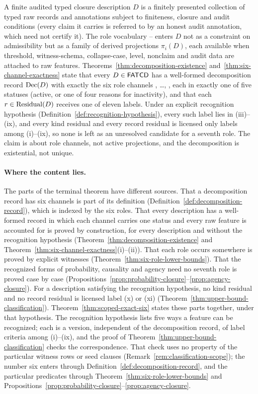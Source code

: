 A finite audited typed closure description \(D\) is a finitely
presented collection of typed raw records and annotations subject to
finiteness, closure and audit conditions (every claim it carries is referred
to by an honest audit annotation, which need not certify it). The role
vocabulary \Pone{}--\Psix{} enters \(D\) not as a constraint on
admissibility but as a family of derived projections \(\pi_i(D)\),
each available when threshold, witness-schema, collapse-case, level,
nonclaim and audit data are
attached to raw features. Theorems~\ref{thm:decomposition-existence} and~\ref{thm:six-channel-exactness} state that
every \(D \in \mathsf{FATCD}{}\) has a well-formed decomposition record
\(\operatorname{Dec}\!\left(D\right)\) with exactly the six role channels \Pone{}, \ldots, \Psix{},
each in exactly one of five statuses (active, or one of four reasons for
inactivity), and that each \(r\in\operatorname{Residual}\!\left(D\right)\) receives one of eleven labels.
Under an explicit recognition hypothesis
(Definition~\ref{def:recognition-hypothesis}), every such label lies in
(iii)--(ix), and every kind residual and every record residual is licensed only
labels among (i)--(ix), so none is left as an unresolved candidate for a
seventh role. The claim is about role channels, not active projections, and
the decomposition is existential, not unique.

\paragraph{Where the content lies.} The parts of the terminal theorem have
different sources. That a decomposition record has six channels is part
of its definition (Definition~\ref{def:decomposition-record}), which is
indexed by the six roles. That every description has a well-formed record
in which each channel carries one status and every raw feature is
accounted for is proved by construction, for every description and
without the recognition hypothesis
(Theorem~\ref{thm:decomposition-existence} and
Theorem~\ref{thm:six-channel-exactness}(i)--(ii)). That each role occurs somewhere is
proved by explicit witnesses (Theorem~\ref{thm:six-role-lower-bounds}).
That the recognized forms of probability, causality and agency need no
seventh role is proved case by case
(Propositions~\ref{prop:probability-closure}--\ref{prop:agency-closure}).
For a description satisfying the recognition hypothesis, no kind residual
and no record residual is licensed label (x) or (xi)
(Theorem~\ref{thm:upper-bound-classification}).
Theorem~\ref{thm:scoped-exact-six} states these parts together, under
that hypothesis. The recognition hypothesis lists five ways a feature can be
recognized; each is a version, independent of the decomposition record, of
label criteria among (i)--(ix), and the proof of
Theorem~\ref{thm:upper-bound-classification} checks the correspondence. That
check uses no property of the particular witness rows or seed clauses
(Remark~\ref{rem:classification-scope}); the number six enters through
Definition~\ref{def:decomposition-record}, and the particular predicates
through Theorem~\ref{thm:six-role-lower-bounds} and
Propositions~\ref{prop:probability-closure}--\ref{prop:agency-closure}.

